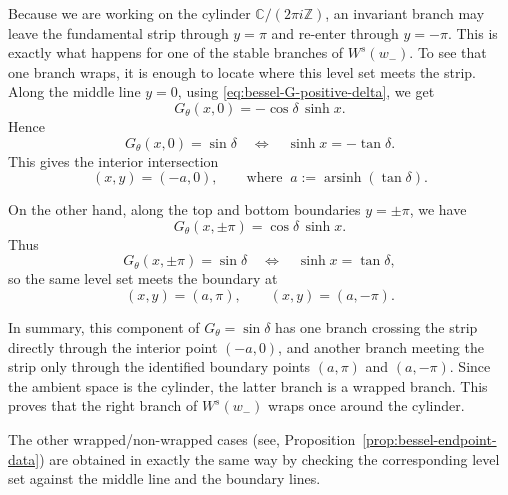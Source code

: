 \documentclass[11pt]{amsart}
\theoremstyle{plain}
\newcommand{\C}{\mathbb C}
\newcommand{\Z}{\mathbb Z}
\begin{document}
Because we are working on the cylinder \(\C/(2\pi i\Z)\), an invariant branch may leave the fundamental strip through \(y=\pi\) and re-enter through \(y=-\pi\).  This is exactly what happens for one of the stable branches of \(W^s(w_-)\). To see that one branch wraps, it is enough to locate where this level set meets the strip. Along the middle line \(y=0\), using \eqref{eq:bessel-G-positive-delta}, we get
\[
G_\theta(x,0)=-\cos\delta\,\sinh x.
\]
Hence
\[
G_\theta(x,0)=\sin\delta
\quad\Longleftrightarrow\quad
\sinh x=-\tan\delta.
\]
This gives the interior intersection
\[
(x,y)=(-a,0),\qquad \text{where }~a:=\operatorname{arsinh}(\tan\delta).
\]

On the other hand, along the top and bottom boundaries \(y=\pm\pi\), we have
\[
G_\theta(x,\pm\pi)=\cos\delta\,\sinh x.
\]
Thus
\[
G_\theta(x,\pm\pi)=\sin\delta
\quad\Longleftrightarrow\quad
\sinh x=\tan\delta,
\]
so the same level set meets the boundary at
\begin{equation*}\label{eq:bessel-boundary-intersection}
(x,y)=(a,\pi),
\qquad
(x,y)=(a,-\pi).
\end{equation*}

In summary, this component of \(G_\theta=\sin\delta\) has one branch crossing the strip directly through the interior point \((-a,0)\), and another branch meeting the strip only through the identified boundary points \((a,\pi)\) and \((a,-\pi)\).  Since the ambient space is the cylinder, the latter branch is a wrapped branch.  This proves that the right branch of \(W^s(w_-)\) wraps once around the cylinder.

The other wrapped/non-wrapped cases (see, Proposition~\ref{prop:bessel-endpoint-data}) are obtained in exactly the same way by checking the corresponding level set against the middle line and the boundary lines.
\end{document}
